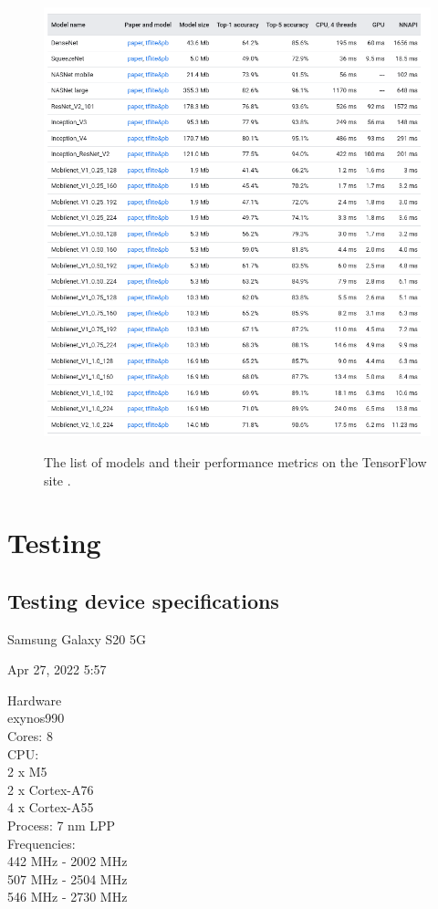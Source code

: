 \documentclass{article}
\begin{document}
\begin{figure}[h]\
    \centering
    \includegraphics[width=\textwidth]{models.png}
    \caption{The list of models and their performance metrics on the TensorFlow site \cite{TFhostedmodels}.}
    \label{fig:models}
\end{figure}
\clearpage

\section{Testing}
\subsection{Testing device specifications}

\label{subsec:phone_spec}

Samsung Galaxy S20 5G

\par

Apr 27, 2022 5:57

\par

Hardware \\
exynos990 \\
Cores: 8 \\
CPU: \\
2 x M5 \\
2 x Cortex-A76 \\
4 x Cortex-A55 \\
Process: 7 nm LPP \\
Frequencies: \\
442 MHz - 2002 MHz \\
507 MHz - 2504 MHz \\ 
546 MHz - 2730 MHz
\end{document}
